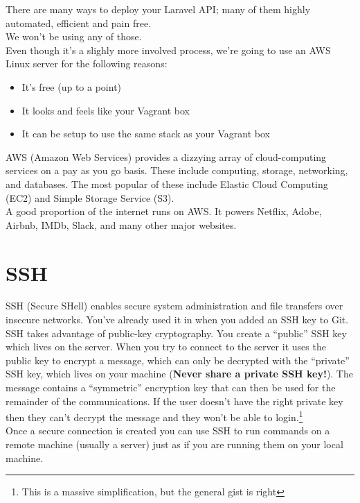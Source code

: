There are many ways to deploy your Laravel API; many of them highly automated, efficient and pain free.
\\

We won't be using any of those.
\\

Even though it's a slighly more involved process, we're going to use an AWS Linux server for the following reasons:

\begin{itemize}
    \item It's free (up to a point)
    \item It looks and feels like your Vagrant box
    \item It can be setup to use the same stack as your Vagrant box
\end{itemize}

AWS (Amazon Web Services) provides a dizzying array of cloud-computing services on a pay as you go basis. These include computing, storage, networking, and databases. The most popular of these include Elastic Cloud Computing (EC2) and Simple Storage Service (S3).
\\

A good proportion of the internet runs on AWS. It powers Netflix, Adobe, Airbnb, IMDb, Slack, and many other major websites.

\section{SSH}

SSH (Secure SHell) enables secure system administration and file transfers over insecure networks. You've already used it in when you added an SSH key to Git.
\\

SSH takes advantage of public-key cryptography. You create a ``public'' SSH key which lives on the server. When you try to connect to the server it uses the public key to encrypt a message, which can only be decrypted with the ``private'' SSH key, which lives on your machine (\textbf{Never share a private SSH key!}). The message contains a ``symmetric'' encryption key that can then be used for the remainder of the communications. If the user doesn't have the right private key then they can't decrypt the message and they won't be able to login.\footnote{This is a massive simplification, but the general gist is right}
\\

Once a secure connection is created you can use SSH to run commands on a remote machine (usually a server) just as if you are running them on your local machine.

